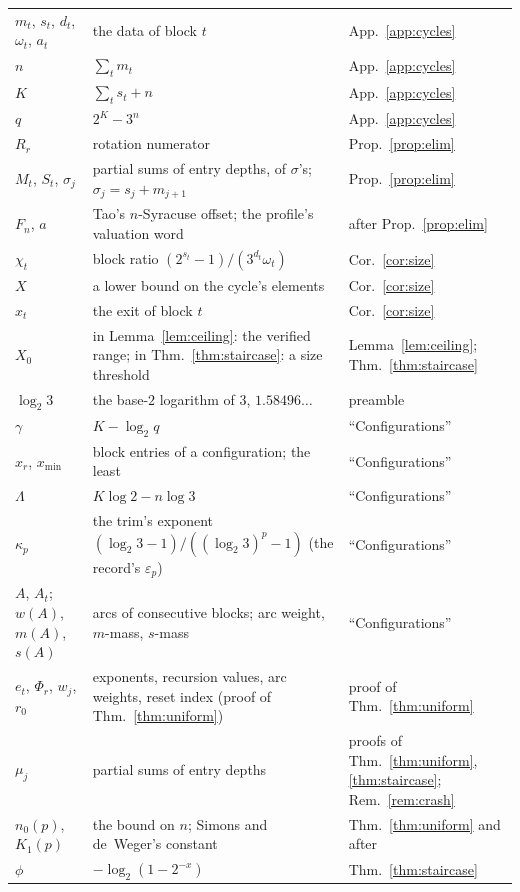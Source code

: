 \documentclass[11pt]{article}
\theoremstyle{remark}
\newcommand{\w}{\omega}
\newcommand{\LL}{\log_2 3}
\newcommand{\kp}{\kappa_p}
\begin{document}
{\begin{longtable}{>{\raggedright\arraybackslash}p{}>{\raggedright\arraybackslash}p{}>{\raggedright\arraybackslash}p{}}
$m_t$, $s_t$, $d_t$, $\w_t$, $a_t$ & the data of block $t$ & App.~\ref{app:cycles} \\
$n$ & $\sum_t m_t$ & App.~\ref{app:cycles} \\
$K$ & $\sum_t s_t + n$ & App.~\ref{app:cycles} \\
$q$ & $2^K - 3^n$ & App.~\ref{app:cycles} \\
$R_r$ & rotation numerator & Prop.~\ref{prop:elim} \\
$M_t$, $S_t$, $\sigma_j$ & partial sums of entry depths, of $\sigma$'s; $\sigma_j = s_j + m_{j+1}$ & Prop.~\ref{prop:elim} \\
$F_n$, $a$ & Tao's $n$-Syracuse offset; the profile's valuation word & after Prop.~\ref{prop:elim} \\
$\chi_t$ & block ratio $(2^{s_t}-1)/(3^{d_t}\w_t)$ & Cor.~\ref{cor:size} \\
$X$ & a lower bound on the cycle's elements & Cor.~\ref{cor:size} \\
$x_t$ & the exit of block $t$ & Cor.~\ref{cor:size} \\
$X_0$ & in Lemma~\ref{lem:ceiling}: the verified range; in Thm.~\ref{thm:staircase}: a size threshold & Lemma~\ref{lem:ceiling}; Thm.~\ref{thm:staircase} \\
$\LL$ & the base-$2$ logarithm of $3$, $1.58496\ldots$ & preamble \\
$\gamma$ & $K - \log_2 q$ & ``Configurations'' \\
$x_r$, $x_{\min}$ & block entries of a configuration; the least & ``Configurations'' \\
$\Lambda$ & $K\log 2 - n\log 3$ & ``Configurations'' \\
$\kp$ & the trim's exponent $(\LL-1)/((\LL)^p - 1)$ (the record's $\varepsilon_p$) & ``Configurations'' \\
$A$, $A_t$; $w(A)$, $m(A)$, $s(A)$ & arcs of consecutive blocks; arc weight, $m$-mass, $s$-mass & ``Configurations'' \\
$e_t$, $\Phi_r$, $w_j$, $r_0$ & exponents, recursion values, arc weights, reset index (proof of Thm.~\ref{thm:uniform}) & proof of Thm.~\ref{thm:uniform} \\
$\mu_j$ & partial sums of entry depths & proofs of Thm.~\ref{thm:uniform}, \ref{thm:staircase}; Rem.~\ref{rem:crash} \\
$n_0(p)$, $K_1(p)$ & the bound on $n$; Simons and de~Weger's constant & Thm.~\ref{thm:uniform} and after \\
$\phi$ & $-\log_2(1 - 2^{-x})$ & Thm.~\ref{thm:staircase} \\

\end{longtable}}
\end{document}
